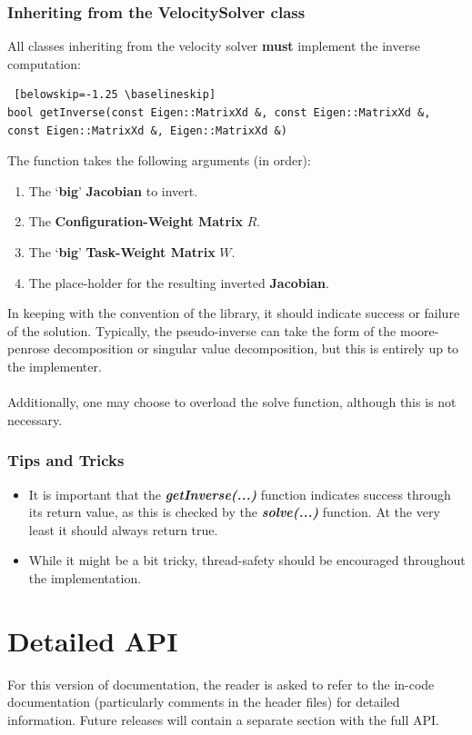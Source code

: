 \documentclass[12pt,a4paper,onecolumn]{article}
\begin{document}
\subsubsection*{Inheriting from the VelocitySolver class}
All classes inheriting from the velocity solver \textbf{must} implement the inverse computation:
\begin{lstlisting} [belowskip=-1.25 \baselineskip]
bool getInverse(const Eigen::MatrixXd &, const Eigen::MatrixXd &, const Eigen::MatrixXd &, Eigen::MatrixXd &)
\end{lstlisting}
The function takes the following arguments (in order):
\begin{enumerate}
\item The `\textbf{big}' \textbf{Jacobian} to invert.
\item The \textbf{Configuration-Weight Matrix} $R$.
\item The `\textbf{big}' \textbf{Task-Weight Matrix} $W$.
\item The place-holder for the resulting inverted \textbf{Jacobian}.
\end{enumerate}
In keeping with the convention of the library, it should indicate success or failure of the solution. Typically, the pseudo-inverse can take the form of the moore-penrose decomposition or singular value decomposition, but this is entirely up to the implementer.\\
\\
\noindent Additionally, one may choose to overload the solve function, although this is not necessary.
\subsubsection*{Tips and Tricks}
\begin{itemize}
\item It is important that the \textbf{\textit{getInverse(...)}} function indicates success through its return value, as this is checked by the \textbf{\textit{solve(...)}} function. At the very least it should always return true.
\item While it might be a bit tricky, thread-safety should be encouraged throughout the implementation.
\end{itemize}


\newpage
\section{Detailed API}
\label{MANAGING_THE_LIBRARY}
For this version of documentation, the reader is asked to refer to the in-code documentation (particularly comments in the header files) for detailed information. Future releases will contain a separate section with the full API.
\end{document}
